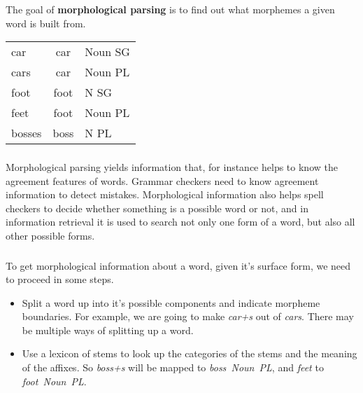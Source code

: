 \begin{frame}

	\frametitle{\insertsection}
	\framesubtitle{\insertsubsection}
	
	The goal of \textbf{morphological parsing} is to find out what morphemes a given word is built from.
	
	\begin{table}
			\centering
			\begin{tabular}{ l c l }
				\rowcolor{LightGray} car & car & Noun SG \\
				\rowcolor{LightGray} cars & car & Noun PL \\
				\rowcolor{LightGray} foot & foot & N SG \\
				\rowcolor{LightGray} feet & foot & Noun PL \\
				\rowcolor{LightGray} bosses & boss & N PL \\
			\end{tabular}
	\end{table}

\end{frame}


\begin{frame}

	\frametitle{\insertsection}
	\framesubtitle{\insertsubsection}
	
	Morphological parsing yields information that, for instance helps to know the agreement features of words.
	Grammar checkers need to know agreement information to detect mistakes. 
	Morphological information also helps spell checkers to decide whether something is a possible word or not, 
	and in information retrieval it is used to search not only one form of a word, but also all other possible forms.

\end{frame}


\begin{frame}

	\frametitle{\insertsection}
	\framesubtitle{\insertsubsection}
	
	To get morphological information about a word, given it's surface form, we need to proceed in some steps.
	
	\begin{itemize}
		\item Split a word up into it's possible components and indicate morpheme boundaries. For example, we are going to make \textit{car+s} out of \textit{cars}.
		There may be multiple ways of splitting up a word.
		\item Use a lexicon of stems to look up the categories of the stems and the meaning of the affixes. So \textit{boss+s} will be mapped
		to \textit{boss~Noun~PL}, and \textit{feet} to \textit{foot~Noun~PL}.
	\end{itemize}

\end{frame}



